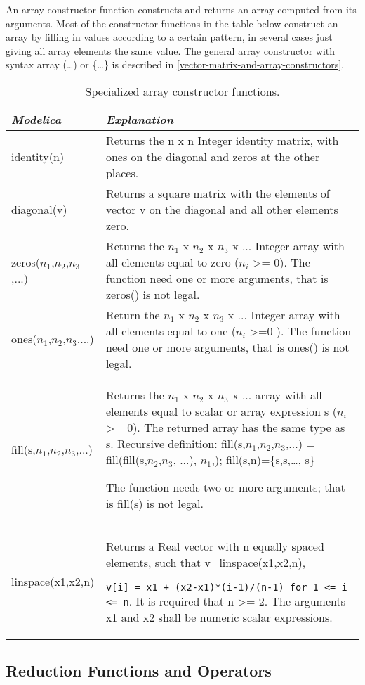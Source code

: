 An array constructor function constructs and returns an array computed
from its arguments. Most of the constructor functions in the table below
construct an array by filling in values according to a certain pattern,
in several cases just giving all array elements the same value. The
general array constructor with syntax array (\ldots{}) or \{\ldots{}\}
is described in \ref{vector-matrix-and-array-constructors}.

\begin{longtable}[]{|l|p{11cm}|}
\caption{Specialized array constructor functions.}\\
\hline
\emph{Modelica} & \emph{Explanation}\\ \hline
\endhead
identity(n)
&
Returns the n x n Integer identity matrix, with ones on the diagonal and
zeros at the other places.\\ \hline
diagonal(v)
&
Returns a square matrix with the elements of vector v on the diagonal
and all other elements zero.\\ \hline
zeros($n_1$,$n_2$,$n_3$,...) &
Returns the $n_1$ x $n_2$ x $n_3$ x ... Integer array with all elements equal to zero ($n_i$
\textgreater{}= 0). The function need one or more arguments, that is
zeros() is not legal.\\ \hline
ones($n_1$,$n_2$,$n_3$,...) &
Return the $n_1$ x $n_2$ x $n_3$ x ... Integer array with all elements equal to one ($n_i$
\textgreater{}=0 ). The function need one or more arguments, that is
ones() is not legal.\\ \hline
fill(s,$n_1$,$n_2$,$n_3$,...) &
Returns the $n_1$ x $n_2$ x $n_3$ x ... array with all elements equal to scalar or array expression s
($n_i$ \textgreater{}= 0). The returned array has the same
type as s.
Recursive definition:
fill(s,$n_1$,$n_2$,$n_3$,...) =
fill(fill(s,$n_2$,$n_3$, ...),
$n_1$,); fill(s,n)=\{s,s,\ldots{}, s\}

The function needs two or more arguments; that is fill(s) is not
legal.\\ \hline
linspace(x1,x2,n)
&
Returns a Real vector with n equally spaced elements, such that
v=linspace(x1,x2,n),

\lstinline!v[i] = x1 + (x2-x1)*(i-1)/(n-1) for 1 <= i <= n!.
It is required that n \textgreater{}= 2. The arguments x1 and x2 shall
be numeric scalar expressions.\\ \hline
\end{longtable}

\subsection{Reduction Functions and Operators}

